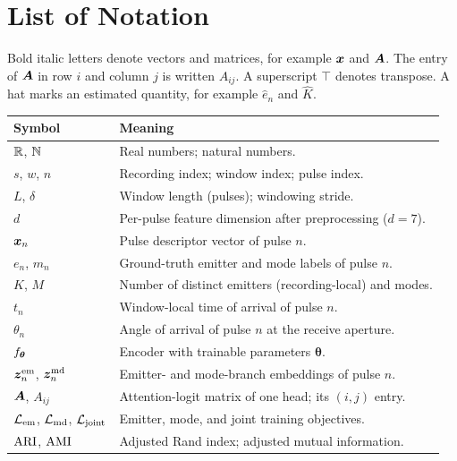 \cleardoublepage%
%
\chapter*{List of Notation}

Bold italic letters denote vectors and matrices, for example $\bm{x}$ and $\bm{A}$.
The entry of $\bm{A}$ in row $i$ and column $j$ is written $A_{ij}$.
A superscript $\top$ denotes transpose.
A hat marks an estimated quantity, for example $\hat{e}_n$ and $\hat{K}$.

\begin{center}
\begin{tabular}{@{}lp{}@{}}
\toprule
Symbol & Meaning \\
\midrule
$\mathbb{R}$, $\mathbb{N}$ & Real numbers; natural numbers. \\
$s$, $w$, $n$ & Recording index; window index; pulse index. \\
$L$, $\delta$ & Window length (pulses); windowing stride. \\
$d$ & Per-pulse feature dimension after preprocessing ($d=7$). \\
$\bm{x}_n$ & Pulse descriptor vector of pulse $n$. \\
$e_n$, $m_n$ & Ground-truth emitter and mode labels of pulse $n$. \\
$K$, $M$ & Number of distinct emitters (recording-local) and modes. \\
$t_n$ & Window-local time of arrival of pulse $n$. \\
$\theta_n$ & Angle of arrival of pulse $n$ at the receive aperture. \\
$f_{\bm{\theta}}$ & Encoder with trainable parameters $\bm{\theta}$. \\
$\bm{z}^{\mathrm{em}}_n$, $\bm{z}^{\mathrm{md}}_n$ & Emitter- and mode-branch embeddings of pulse $n$. \\
$\bm{A}$, $A_{ij}$ & Attention-logit matrix of one head; its $(i,j)$ entry. \\
$\mathcal{L}_{\mathrm{em}}$, $\mathcal{L}_{\mathrm{md}}$, $\mathcal{L}_{\mathrm{joint}}$ & Emitter, mode, and joint training objectives. \\
$\mathrm{ARI}$, $\mathrm{AMI}$ & Adjusted Rand index; adjusted mutual information. \\
\bottomrule
\end{tabular}
\end{center}
